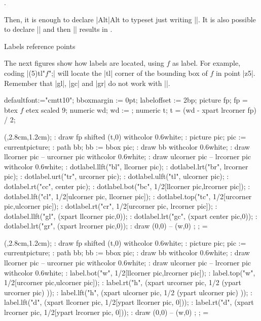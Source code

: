 \def\makekey#1{\expandafter\defkey\csname#1\endcsname{#1}}
.

\beginlisting
{}
\endlisting


Then, it is enough to declare |\makekey{Alt}|\makekey{Alt} to
typeset {\Alt} just writing |\Alt|.  It is also possible to
declare || 
and then |\escape| results in \escape.


\beginsection Labels reference points

The next figures show how labels are located, using $f$ as label.
For example, coding |\MTlabel(5)tl"$f$";| will locate
the |tl| corner of the bounding box of $f$ in point |z5|.
Remember that |gl|, |gc| and |gr| do not work with |\MPlabel|.

\newdimen\wid \dimen\wid=3cm

\MTcode
defaultfont:="cmtt10";
bboxmargin := 0pt; labeloffset := 2bp;
picture fp; fp = btex $f$ etex scaled 9;
numeric wd; wd := \the\dimen\wid;
numeric t; t = (wd - xpart lrcorner fp) / 2;

\MTline{}

\MTbeginchar(\the\dimen\wid,2.8cm,1.2cm);
\MT: draw fp shifted (t,0) withcolor 0.6white;
\MT: picture pic; pic := currentpicture;
\MT: path bb; bb := bbox pic;
\MT: draw bb withcolor 0.6white;
\MT: draw llcorner pic -- urcorner pic withcolor 0.6white;
\MT: draw ulcorner pic -- lrcorner pic withcolor 0.6white;
\MT: dotlabel.llft("bl", llcorner pic);
\MT: dotlabel.lrt("br",  lrcorner pic);
\MT: dotlabel.urt("tr", urcorner pic);
\MT: dotlabel.ulft("tl",  ulcorner pic);
\MT: dotlabel.rt("cc", center pic);
\MT: dotlabel.bot("bc", 1/2[llcorner pic,lrcorner pic]);
\MT: dotlabel.lft("cl", 1/2[ulcorner pic, llcorner pic]);
\MT: dotlabel.top("tc", 1/2[urcorner pic,ulcorner pic]);
\MT: dotlabel.rt("cr",  1/2[urcorner pic, lrcorner pic]);
\MT: dotlabel.llft("gl", (xpart llcorner pic,0));
\MT: dotlabel.lrt("gc", (xpart center pic,0));
\MT: dotlabel.lrt("gr", (xpart lrcorner pic,0));
\MT: draw (0,0) -- (w,0) ; %
\MTendchar;
=\box\MTbox

\MTbeginchar(\the\dimen\wid,2.8cm,1.2cm);
\MT: draw fp shifted (t,0) withcolor 0.6white;
\MT: picture pic; pic := currentpicture;
\MT: path bb; bb := bbox pic;
\MT: draw bb withcolor 0.6white;
\MT: draw llcorner pic -- urcorner pic withcolor 0.6white;
\MT: draw ulcorner pic -- lrcorner pic withcolor 0.6white;
\MT: label.bot("w", 1/2[llcorner pic,lrcorner pic]);
\MT: label.top("w", 1/2[urcorner pic,ulcorner pic]);
\MT: label.rt("h", (xpart urcorner pic, 1/2 (ypart urcorner pic) ));
\MT: label.lft("h", (xpart ulcorner pic, 1/2 (ypart ulcorner pic) ));
\MT: label.lft("d", (xpart llcorner pic, 1/2[ypart llcorner pic, 0]));
\MT: label.rt("d", (xpart lrcorner pic,  1/2[ypart lrcorner pic, 0]));
\MT: draw (0,0) -- (w,0) ; %
\MTendchar;
=\box\MTbox

